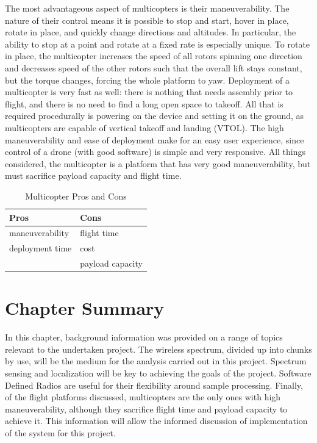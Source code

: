 The most advantageous aspect of multicopters is their maneuverability. The nature of their control means it is possible to stop and start, hover in place, rotate in place, and quickly change directions and altitudes. In particular, the ability to stop at a point and rotate at a fixed rate is especially unique. To rotate in place, the multicopter increases the speed of all rotors spinning one direction and decreases speed of the other rotors such that the overall lift stays constant, but the torque changes, forcing the whole platform to yaw\cite{multicopter_dynamics}. Deployment of a multicopter is very fast as well: there is nothing that needs assembly prior to flight, and there is no need to find a long open space to takeoff. All that is required procedurally  is powering on the device and setting it on the ground, as multicopters are capable of vertical takeoff and landing (VTOL). The high maneuverability and ease of deployment make for an easy user experience, since control of a drone (with good software) is simple and very responsive. All things considered, the multicopter is a platform that has very good maneuverability, but must sacrifice payload capacity and flight time.
\begin{table}[ht]
\centering
\caption{Multicopter Pros and Cons}
\label{table:multi_pc}
\begin{tabular}{l|l}
  Pros & Cons \\ \hline
  maneuverability & flight time \\
  deployment time & cost \\
   & payload capacity \\
\end{tabular}
\end{table}\par

\section{Chapter Summary}
In this chapter, background information was provided on a range of topics relevant to the undertaken project. The wireless spectrum, divided up into chunks by use, will be the medium for the analysis carried out in this project. Spectrum sensing and localization will be key to achieving the goals of the project. Software Defined Radios are useful for their flexibility around sample processing. Finally, of the flight platforms discussed, multicopters are the only ones with high maneuverability, although they sacrifice flight time and payload capacity to achieve it. This information will allow the informed discussion of implementation of the system for this project.

